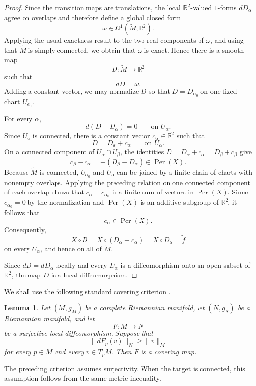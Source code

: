 \documentclass[a4paper,11pt]{amsart}
\numberwithin{equation}{section}
\theoremstyle{plain}
\newtheorem{lem}[thm]{Lemma}
\begin{document}
\begin{proof}
Since the transition maps are translations, the local
$\mathbb R^2$-valued $1$-forms $dD_\alpha$ agree on overlaps and
therefore define a global closed form
\[
\omega\in\Omega^1(\widetilde M;\mathbb R^2).
\]
Applying the usual exactness result to the two real components of
$\omega$, and using that $\widetilde M$ is simply connected, we obtain
that $\omega$ is exact. Hence
there is a smooth map
\[
D:\widetilde M\longrightarrow\mathbb R^2
\]
such that
\[
dD=\omega.
\]
Adding a constant vector, we may normalize $D$ so that
$D=D_{\alpha_0}$ on one fixed chart $U_{\alpha_0}$.

For every $\alpha$,
\[
d(D-D_\alpha)=0
\qquad\text{on }U_\alpha.
\]
Since $U_\alpha$ is connected, there is a constant vector
$c_\alpha\in\mathbb R^2$ such that
\[
D=D_\alpha+c_\alpha
\qquad\text{on }U_\alpha.
\]
On a connected component of $U_\alpha\cap U_\beta$, the identities
$D=D_\alpha+c_\alpha=D_\beta+c_\beta$ give
\[
c_\beta-c_\alpha
=-(D_\beta-D_\alpha)\in\operatorname{Per}(X).
\]
Because $\widetilde M$ is connected, $U_{\alpha_0}$ and $U_\alpha$ can be
joined by a finite chain of charts with nonempty overlaps. Applying the
preceding relation on one connected component of each overlap shows that
$c_\alpha-c_{\alpha_0}$ is a finite sum of vectors in
$\operatorname{Per}(X)$. Since $c_{\alpha_0}=0$ by the normalization and
$\operatorname{Per}(X)$ is an additive subgroup of $\mathbb R^2$, it follows
that
\[
c_\alpha\in\operatorname{Per}(X).
\]
Consequently,
\[
X\circ D
=
X\circ(D_\alpha+c_\alpha)
=
X\circ D_\alpha
=
\widetilde f
\]
on every $U_\alpha$, and hence on all of $\widetilde M$.

Since $dD=dD_\alpha$ locally and every $D_\alpha$ is a
diffeomorphism onto an open subset of $\mathbb R^2$, the map $D$ is
a local diffeomorphism.
\end{proof}

We shall use the following standard covering criterion
\cite[Chapter~VII, Lemma~3.3]{doCarmo1992}.

\begin{lem}\label{lem:surjective_covering_criterion}
Let $(M,g_M)$ be a complete Riemannian manifold, let $(N,g_N)$ be a
Riemannian manifold, and let
\[
F:M\longrightarrow N
\]
be a surjective local diffeomorphism. Suppose that
\[
\lVert dF_p(v)\rVert_N
\geq
\lVert v\rVert_M
\]
for every $p\in M$ and every $v\in T_pM$. Then $F$ is a covering map.
\end{lem}

The preceding criterion assumes surjectivity. When the target is
connected, this assumption follows from the same metric inequality.
\end{document}
